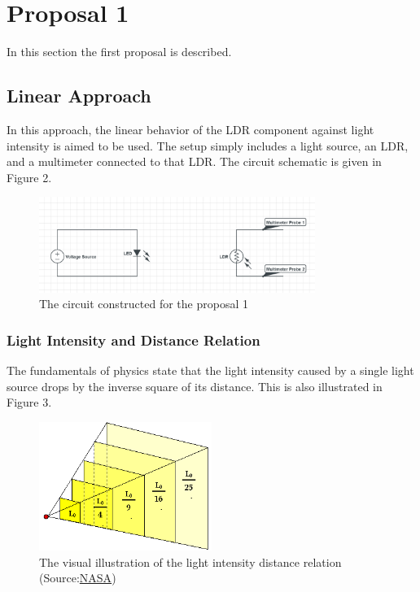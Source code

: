 \documentclass[letterpaper,12pt]{article}
\begin{document}
\section{Proposal 1}
In this section the first proposal is described.
\subsection{Linear Approach}
In this approach, the linear behavior of the LDR component against light intensity is aimed to be used. The setup simply includes a light source, an LDR, and a multimeter connected to that LDR. The circuit schematic is given in Figure 2.
\begin{figure}[H]
	\centering
   \includegraphics[width=0.8\textwidth]{circuit1.png}
   \caption{The circuit constructed for the proposal 1}
\end{figure} 

\subsubsection{Light Intensity and Distance Relation}
The fundamentals of physics state that the light intensity caused by a single light source drops by the inverse square of its distance. This is also illustrated in Figure 3.
\begin{figure}[H]
	\centering
   \includegraphics[width=0.5\textwidth]{light_intensity_vs_distance.png}
   \caption{The visual illustration of the light intensity distance relation (Source:\hyperref[sec:ref]{NASA})}
\end{figure} 
\end{document}
